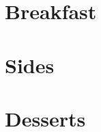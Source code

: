 \documentclass{book}
\begin{document}
\tableofcontents
\chapter{Breakfast}

\chapter{Sides}

\chapter{Desserts}


\end{document}
